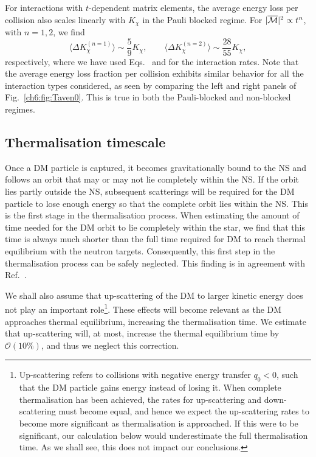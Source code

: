 For interactions with $t$-dependent matrix elements, the average energy loss per collision also scales linearly with $K_\chi$ in the Pauli blocked regime. For $|\overline{\mathcal M}|^2 \propto t^n$, with $n=1,2$, we find 
\begin{equation}
  \langle \Delta K_\chi^{(n=1)}\rangle \sim \frac{5}{9}K_\chi, \qquad 
  \langle \Delta K_\chi^{(n=2)} \rangle \sim \frac{28}{55}K_\chi ,
  \label{ch6:eq:aveElossn12}
\end{equation}
respectively, where we have used Eqs.~ and  for the interaction rates.
Note that the average energy loss fraction per collision exhibits similar behavior for all the interaction types considered,  
as seen by comparing the left and right panels of Fig.~\ref{ch6:fig:Taven0}. 
This is true in both the Pauli-blocked and non-blocked regimes.





\subsection{Thermalisation timescale}
\label{ch6:sec:thermstandard}




Once a DM particle is captured, it becomes gravitationally bound to the NS and follows an orbit that may or may not lie completely within the NS. If the orbit lies partly outside the NS, subsequent scatterings will be required for the DM particle to lose enough energy so that the complete orbit lies within the NS. This is the first stage in the thermalisation process. When estimating the amount of time needed for the DM orbit to lie completely within the star,  we find that this time is always much shorter than the full time required for DM to reach thermal equilibrium with the neutron targets. Consequently, this first step in the thermalisation process can be safely neglected. This finding is in agreement with Ref.~\cite{Garani:2018kkd_may_NewAnalysisNeutron}. 

We shall also assume that up-scattering of the DM to larger kinetic energy does not play an important role\footnote{Up-scattering refers to collisions with negative energy transfer $q_0<0$, such that the DM particle gains energy instead of losing it. When complete thermalisation has been achieved, the rates for up-scattering and down-scattering must become equal, and hence we expect the up-scattering rates to become more significant as thermalisation is approached.
If this were to be significant, our calculation below would underestimate the full thermalisation time. As we shall see, this does not impact our conclusions.}. These effects will become relevant as the DM approaches thermal equilibrium, increasing the thermalisation time. We estimate that up-scattering will, at most, increase the thermal equilibrium time by $\mathcal{O}(10\%)$, and thus we neglect this correction. 


